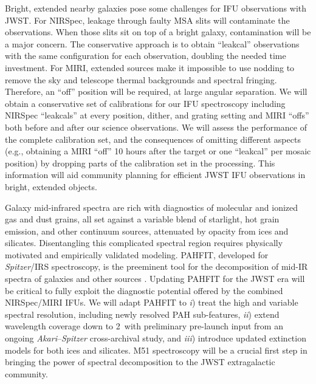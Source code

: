 \documentclass[12pt]{article}
\begin{document}
 Bright, extended nearby galaxies pose some challenges for IFU observations with JWST. For NIRSpec, leakage through faulty MSA slits will contaminate the observations.  When those slits sit on top of a bright galaxy, contamination will be a major concern.  The conservative approach is to obtain ``leakcal'' observations with the same configuration for each observation, doubling the needed time investment.  For MIRI, extended sources make it impossible to use nodding to remove the sky and telescope thermal backgrounds and spectral fringing.  Therefore, an ``off'' position will be required, at large angular separation. %
We will obtain a conservative set of calibrations for our IFU spectroscopy including NIRSpec ``leakcals'' at every position, dither, and grating setting and MIRI ``offs'' both before and after our science observations. We will assess the performance of the complete calibration set, and the consequences of omitting different aspects (e.g., obtaining a MIRI ``off'' 10 hours after the target or one ``leakcal'' per mosaic position) by dropping parts of the calibration set in the processing. This information will aid community planning for efficient JWST IFU observations in bright, extended objects.

\vspace{0.05in} 

  Galaxy mid-infrared spectra are rich with diagnostics of molecular and ionized gas and dust grains, all set against a variable blend of starlight, hot grain emission, and other continuum sources, attenuated by opacity from ices and silicates.  Disentangling this complicated spectral region requires physically motivated and empirically validated modeling.  PAHFIT, developed for {\em Spitzer}/IRS spectroscopy, is the preeminent tool for the decomposition of mid-IR spectra of galaxies and other sources \citep{smith2007}.  Updating PAHFIT for the JWST era will be critical to fully exploit the diagnostic potential offered by the combined NIRSpec/MIRI IFUs.  We will adapt PAHFIT to {\em i}) treat the high and variable spectral resolution, including newly resolved PAH sub-features, {\em ii}) extend wavelength coverage down to 2\micron\ with preliminary pre-launch input from an ongoing {\em Akari}--{\em Spitzer} cross-archival study, and {\em iii}) introduce updated extinction models for both ices and silicates.  M51 spectroscopy will be a crucial first step in bringing the power of spectral decomposition to the JWST extragalactic community.
\end{document}
